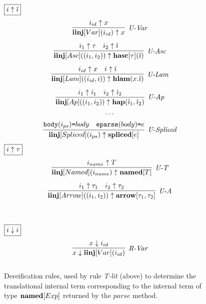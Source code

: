 \begin{figure}[t]
\centering
\begin{minipage}[t]{.51\textwidth}
$\fbox{$i \uparrow \hat{\imath}$}$
\vspace{-20px}
   \[
\begin{array}{c}
\infer[\textit{U-Var}]
	{ \keyw{iinj}[Var](i_{id}) \uparrow x}
	{ i_{id} \uparrow x} \\[2ex]

\infer[\textit{U-Asc}]
	{\keyw{iinj}[Asc]((i_1, i_2)) \uparrow \keyw{hasc}[\tau](\ih)}
	{i_1 \uparrow \tau & i_2 \uparrow \ih}\\[2ex]
	
\infer[\textit{U-Lam}]
	{ \keyw{iinj}[Lam]((i_{id}, i)) \uparrow \keyw{hlam}(x.\ih) }
	{ i_{id} \uparrow x & i \uparrow \ih } \\[2ex]

\infer[\textit{U-Ap}]
	{ \keyw{iinj}[Ap]((i_1, i_2)) \uparrow  \keyw{hap}(\ih_1, \ih_2)}
	{ i_1 \uparrow \ih_1 & i_2 \uparrow \ih_2  } \\[1ex]
\cdots\\[1ex]
\infer[\textit{U-Spliced}]
      {\keyw{iinj}[Spliced](i_{ps}) \uparrow \keyw{spliced}[e]}
	  {\texttt{body}(i_{ps})\texttt{=}body & \texttt{eparse}(body)\texttt{=}e}
\end{array}
\]
$\fbox{$i \uparrow \tau$}$
\vspace{-15px}
\[
\begin{array}{c}
\infer[\textit{U-T}]
	{ \keyw{iinj}[Named](i_{name}) \uparrow \keyw{named}[T]}
	{ i_{name} \uparrow T} \\[2ex]

\infer[\textit{U-A}]
	{ \keyw{iinj}[Arrow]((i_1, i_2)) \uparrow \keyw{arrow}[\tau_1, \tau_2]}
	{ i_1 \uparrow \tau_1 & i_2 \uparrow \tau_2}
\end{array}
\]
\label{fig:dereification}
\vspace{-10px}
\caption{Dereification rules, used by rule \textit{T-lit} (above) to determine the translational internal term corresponding to the internal term of type $\textbf{named}[Exp]$ returned by the $parse$ method.}
\end{minipage}%
~\vline\,
\begin{minipage}[t]{.44\textwidth}
$\fbox{$i \downarrow i$}$
\vspace{-20px}
  \[
\begin{array}{c}
\infer[\textit{R-Var}]
	{x \downarrow \keyw{iinj}[Var](i_{id})}
	{x \downarrow i_{id}} \\[2ex]


\end{array}\]
\end{minipage}
\end{figure}
